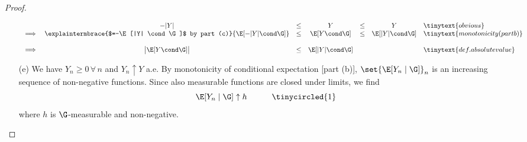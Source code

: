 \documentclass{article} %
\begin{document}
\begin{proof}
\begin{itemize}
%
\[\begin{array}{rcccccl}
& -|Y| &\leq & Y &\leq & Y &\tinytext{obvious} \\
\implies & \explaintermbrace{$=-\E[|Y| \cond \G]$ by part (c)}{\E[-|Y| \cond \G]} &\leq & \E[Y \cond \G]  &\leq & \E[|Y| \cond \G]  &\tinytext{monotonicity (part b)} \\
&&&&&&\\
 \implies & \big| \E[Y \cond \G] \big| &\leq & \E[|Y| \cond \G] & & & \tinytext{def. absolute value}
\end{array}\]
%
\item[(e)] We have $Y_n \geq 0 \, \forall \, n$ and $Y_n \uparrow Y$ a.e.  By monotonicity of conditional expectation [part (b)], $\set{\E[Y_n \mid \G]}_n$ is an increasing sequence of non-negative functions.  Since also measurable functions are closed under limits, we find
\[ \E[Y_n \mid \G] \uparrow h \quad\quad\quad \tinycircled{1} \]
where $h$ is $\G$-measurable and non-negative. 


\end{itemize}
\end{proof}
\end{document}
